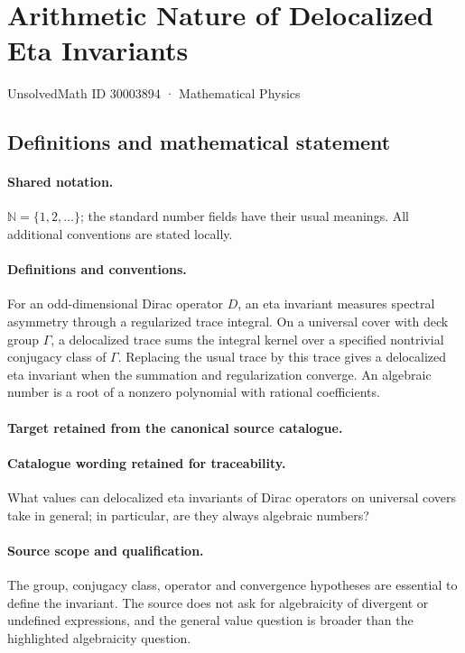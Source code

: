 \documentclass[11pt]{article}
\begin{document}
\setcounter{section}{30003893}
\section{Arithmetic Nature of Delocalized Eta Invariants}\label{30003894}
{\small UnsolvedMath ID 30003894 · Mathematical Physics}
\subsection{Definitions and mathematical statement}

\paragraph{Shared notation.}$\mathbb N=\{1,2,\ldots\}$; the standard number fields have their usual meanings. All additional conventions are stated locally.


\paragraph{Definitions and conventions.}
For an odd-dimensional Dirac operator $D$, an eta invariant measures spectral asymmetry through a regularized trace integral. On a universal cover with deck group $\Gamma$, a delocalized trace sums the integral kernel over a specified nontrivial conjugacy class of $\Gamma$. Replacing the usual trace by this trace gives a delocalized eta invariant when the summation and regularization converge. An algebraic number is a root of a nonzero polynomial with rational coefficients.

\paragraph{Target retained from the canonical source catalogue.}
\paragraph{Catalogue wording retained for traceability.}
What values can delocalized eta invariants of Dirac operators on universal covers take in general; in particular, are they always algebraic numbers?

\paragraph{Source scope and qualification.}
The group, conjugacy class, operator and convergence hypotheses are essential to define the invariant. The source does not ask for algebraicity of divergent or undefined expressions, and the general value question is broader than the highlighted algebraicity question.
\end{document}
